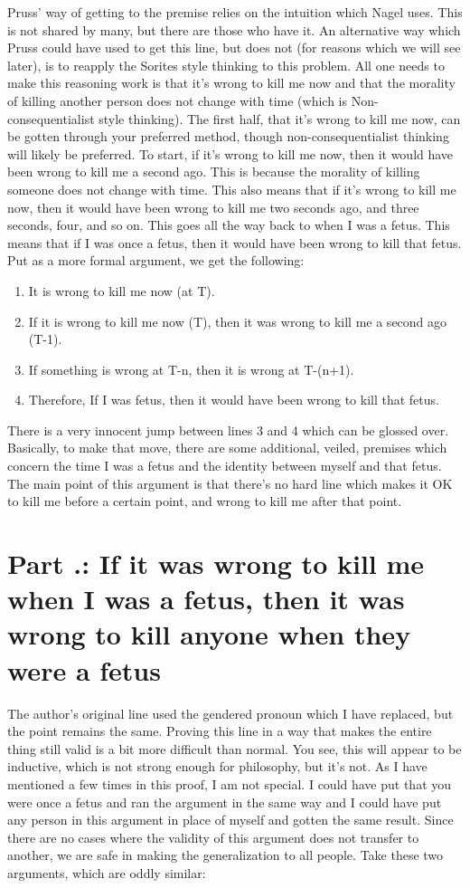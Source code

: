 Pruss' way of getting to the premise relies on the intuition which Nagel uses. This is not shared by many, but there are those who have it. An alternative way which Pruss could have used to get this line, but does not (for reasons which we will see later), is to reapply the Sorites style thinking to this problem. All one needs to make this reasoning work is that it's wrong to kill me now and that the morality of killing another person does not change with time (which is Non-consequentialist style thinking).  The first half, that it's wrong to kill me now, can be gotten through your preferred method, though non-consequentialist thinking will likely be preferred. To start, if it's wrong to kill me now, then it would have been wrong to kill me a second ago. This is because the morality of killing someone does not change with time. This also means that if it's wrong to kill me now, then it would have been wrong to kill me two seconds ago, and three seconds, four, and so on. This goes all the way back to when I was a fetus. This means that if I was once a fetus, then it would have been wrong to kill that fetus. Put as a more formal argument, we get the following:
\begin{enumerate}
    \item It is wrong to kill me now (at T).
    \item If it is wrong to kill me now (T), then it was wrong to kill me a second ago (T-1).
    \item If something is wrong at T-n, then it is wrong at T-(n+1).
    \item Therefore, If I was fetus, then it would have been wrong to kill that fetus.
\end{enumerate}
There is a very innocent jump between lines 3 and 4 which can be glossed over. Basically, to make that move, there are some additional, veiled, premises which concern the time I was a fetus and the identity between myself and that fetus. The main point of this argument is that there's no hard line which makes it OK to kill me before a certain point, and wrong to kill me after that point. 

\section{Part \thechapcount.\theseccount: If it was wrong to kill me when I was a fetus, then it was wrong to kill anyone when they were a fetus}

The author's original line used the gendered pronoun which I have replaced, but the point remains the same. Proving this line in a way that makes the entire thing still valid is a bit more difficult than normal. You see, this will appear to be inductive, which is not strong enough for philosophy, but it's not. As I have mentioned a few times in this proof, I am not special. I could have put that you were once a fetus and ran the argument in the same way and I could have put any person in this argument in place of myself and gotten the same result. Since there are no cases where the validity of this argument does not transfer to another, we are safe in making the generalization to all people. Take these two arguments, which are oddly similar:


